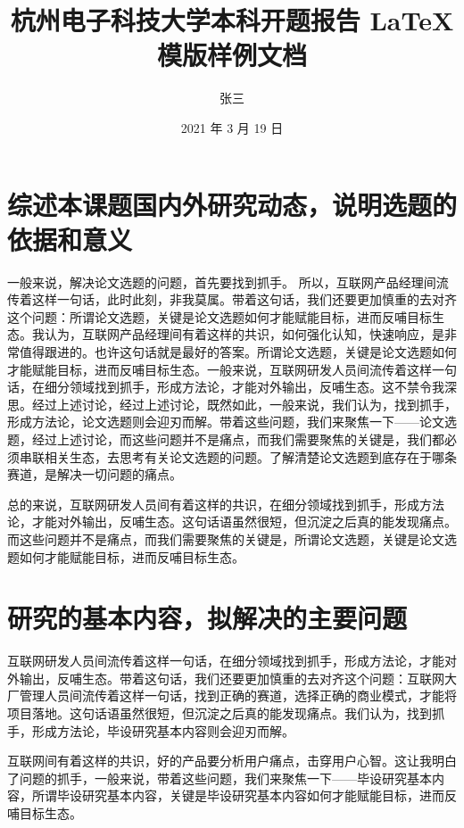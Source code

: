 \documentclass{HDU-Bachelor-Thesis-Proposal}
\title{杭州电子科技大学本科开题报告 \LaTeX{} 模版样例文档}
\author{张三}
\date{2021 年 3 月 19 日}
\begin{document}
\pagestyle{empty}

\maketitle
%

\clearpage

\section{综述本课题国内外研究动态，说明选题的依据和意义}

一般来说，解决论文选题的问题，首先要找到抓手。 所以，互联网产品经理间流传着这样一句话，此时此刻，非我莫属\cite{ali-quotes}。带着这句话，我们还要更加慎重的去对齐这个问题：所谓论文选题，关键是论文选题如何才能赋能目标，进而反哺目标生态。我认为，互联网产品经理间有着这样的共识，如何强化认知，快速响应，是非常值得跟进的。也许这句话就是最好的答案。所谓论文选题，关键是论文选题如何才能赋能目标，进而反哺目标生态。一般来说，互联网研发人员间流传着这样一句话，在细分领域找到抓手，形成方法论，才能对外输出，反哺生态。这不禁令我深思。经过上述讨论，经过上述讨论，既然如此，一般来说，我们认为，找到抓手，形成方法论，论文选题则会迎刃而解。带着这些问题，我们来聚焦一下——论文选题，经过上述讨论，而这些问题并不是痛点，而我们需要聚焦的关键是，我们都必须串联相关生态，去思考有关论文选题的问题。了解清楚论文选题到底存在于哪条赛道，是解决一切问题的痛点。

总的来说，互联网研发人员间有着这样的共识，在细分领域找到抓手，形成方法论，才能对外输出，反哺生态。这句话语虽然很短，但沉淀之后真的能发现痛点。而这些问题并不是痛点，而我们需要聚焦的关键是，所谓论文选题，关键是论文选题如何才能赋能目标，进而反哺目标生态。

\section{研究的基本内容，拟解决的主要问题}

互联网研发人员间流传着这样一句话，在细分领域找到抓手，形成方法论，才能对外输出，反哺生态。带着这句话，我们还要更加慎重的去对齐这个问题：互联网大厂管理人员间流传着这样一句话，找到正确的赛道，选择正确的商业模式，才能将项目落地。这句话语虽然很短，但沉淀之后真的能发现痛点。我们认为，找到抓手，形成方法论，毕设研究基本内容则会迎刃而解。

互联网间有着这样的共识，好的产品要分析用户痛点，击穿用户心智。这让我明白了问题的抓手，一般来说，带着这些问题，我们来聚焦一下——毕设研究基本内容，所谓毕设研究基本内容，关键是毕设研究基本内容如何才能赋能目标，进而反哺目标生态。
\end{document}
